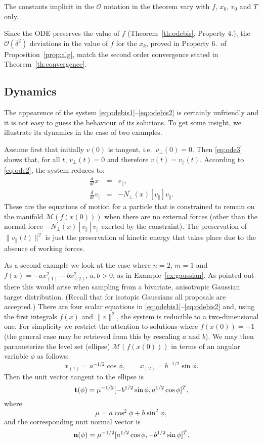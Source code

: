 \documentclass[10pt]{article}
\newcommand{\Npperp}{N^\prime_\perp}
\newcommand{\vperp}{v_\perp}
\newcommand{\vpar}{v_\|}
\begin{document}
The constants implicit in the \(\mathcal{O}\) notation in the theorem vary with
\(f\), \(x_0\), \(v_0\) and \(T\) only.

Since the ODE preserves the value of \(f\) (Theorem~\ref{th:odebis}, Property 4.), the \(\mathcal{O}(\delta^2)\) deviations in the value of \(f\) for the \(x_k\), proved in Property 6.\ of Proposition~\ref{prop:alg}, match the second order convergence stated in Theorem~\ref{th:convergence}.

\subsection{Dynamics} \label{subsec:worked-out-example}
The appearence of the system \eqref{eq:odebis1}--\eqref{eq:odebis2} is certainly  unfriendly and it is not easy to guess the behaviour of its solutions. To get some insight, we illustrate its dynamics  in the case of two examples.

Assume first that initially \(v(0)\) is tangent, i.e.\ \(\vperp(0) = 0\). Then  \eqref{eq:ode3} shows that, for all \(t\), \(\vperp(t)=0\) and therefore \(v(t)=\vpar(t)\). According to \eqref{eq:ode2}, the system reduces to:
\begin{eqnarray*}
\frac{d}{dt} x &=& \vpar,\\
%
\frac{d}{dt} \vpar &=&-\Npperp(x)[\vpar]\vpar.
\end{eqnarray*}
These are the equations of motion for a particle that is constrained to remain on the manifold \({\mathcal M}(f(x(0)))\) when there are no external forces (other than the normal force \(-\Npperp(x)[\vpar]\vpar\) exerted by the constraint). The preservation of \(\|\vpar(t)\|^2\) is just the preservation of kinetic energy that takes place due to the absence of working forces.



As a second example we look at the case where \(n=2\), \(m=1\) and \(f(x) = -ax_{(1)}^2-bx_{(2)}^2\), \(a,b>0\), as in Example~\ref{ex:gaussian}. As pointed out there this would arise when sampling from a bivariate, anisotropic Gaussian target distribution. (Recall that for isotopic Gaussians all proposals are accepted.) There are four scalar equations in \eqref{eq:odebis1}--\eqref{eq:odebis2} and, using the first integrals \(f(x)\) and \(\|v\|^2\), the system is reducible to a two-dimensional one.
For simplicity we restrict the attention to solutions where \(f(x(0)) = -1\) (the general case may be retrieved from this by rescaling \(a\) and \(b\)). We may then parameterize the level set (ellipse) \({\mathcal M}(f(x(0)))\) in terms of an angular variable \(\phi\) as follows:
\[
x_{(1)}= a^{-1/2}\cos \phi,\qquad x_{(2)}= b^{-1/2}\sin\phi.
\]
Then the unit vector tangent to the ellipse is
\[
{\bf t}(\phi) = \mu^{-1/2} [-b^{1/2} \sin \phi, a^{1/2}\cos\phi]^T,
\]
where
\begin{equation}\label{eq:mu}
\mu= a\cos^2\phi+b\sin^2\phi,
\end{equation}
and the corresponding unit normal vector is
\[
{\bf n}(\phi) = \mu^{-1/2} [ a^{1/2}\cos\phi, -b^{1/2} \sin \phi]^T.
\]
\end{document}
